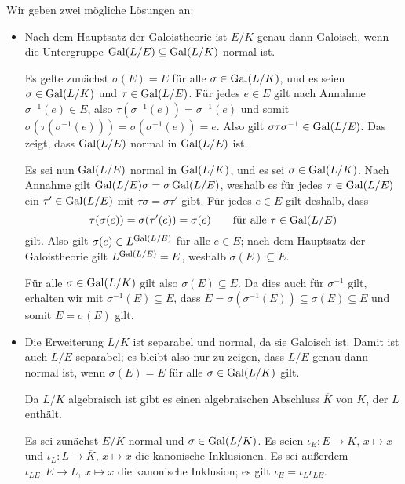 \begin{solution}
  Wir geben zwei mögliche Lösungen an:
  \begin{itemize}
    \item
      Nach dem Hauptsatz der Galoistheorie ist $E/K$ genau dann Galoisch, wenn die Untergruppe $\operatorname{Gal}(L/E) \subseteq \operatorname{Gal}(L/K)$ normal ist.
      
      Es gelte zunächst $\sigma(E) = E$ für alle $\sigma \in \operatorname{Gal}(L/K)$, und es seien $\sigma \in \operatorname{Gal}(L/K)$ und $\tau \in \operatorname{Gal}(L/E)$.
      Für jedes $e \in E$ gilt nach Annahme $\sigma^{-1}(e) \in E$, also $\tau(\sigma^{-1}(e)) = \sigma^{-1}(e)$ und somit $\sigma(\tau(\sigma^{-1}(e))) = \sigma(\sigma^{-1}(e)) = e$.
      Also gilt $\sigma \tau \sigma^{-1} \in \operatorname{Gal}(L/E)$.
      Das zeigt, dass $\operatorname{Gal}(L/E)$ normal in $\operatorname{Gal}(L/E)$ ist.
      
      Es sei nun $\operatorname{Gal}(L/E)$ normal in $\operatorname{Gal}(L/K)$, und es sei $\sigma \in \operatorname{Gal}(L/K)$.
      Nach Annahme gilt $\operatorname{Gal}(L/E) \sigma = \sigma \operatorname{Gal}(L/E)$, weshalb es für jedes $\tau \in \operatorname{Gal}(L/E)$ ein $\tau' \in \operatorname{Gal}(L/E)$ mit $\tau \sigma = \sigma \tau'$ gibt.
      Für jedes $e \in E$ gilt deshalb, dass
      \[
        \tau(\sigma(e)) = \sigma(\tau'(e)) = \sigma(e)
        \qquad
        \text{für alle $\tau \in \operatorname{Gal}(L/E)$}
      \]
      gilt.
      Also gilt $\sigma(e) \in L^{\operatorname{Gal}(L/E)}$ für alle $e \in E$;
      nach dem Hauptsatz der Galoistheorie gilt $L^{\operatorname{Gal}(L/E)} = E$, weshalb $\sigma(E) \subseteq E$.
      
      Für alle $\sigma \in \operatorname{Gal}(L/K)$ gilt also $\sigma(E) \subseteq E$.
      Da dies auch für $\sigma^{-1}$ gilt, erhalten wir mit $\sigma^{-1}(E) \subseteq E$, dass $E = \sigma(\sigma^{-1}(E)) \subseteq \sigma(E) \subseteq E$ und somit $E = \sigma(E)$ gilt.
      
    \item
      Die Erweiterung $L/K$ ist separabel und normal, da sie Galoisch ist.
      Damit ist auch $L/E$ separabel;
      es bleibt also nur zu zeigen, dass $L/E$ genau dann normal ist, wenn $\sigma(E) = E$ für alle $\sigma \in \operatorname{Gal}(L/K)$ gilt.
      
      Da $L/K$ algebraisch ist gibt es einen algebraischen Abschluss $\overline{K}$ von $K$, der $L$ enthält.
      
      Es sei zunächst $E/K$ normal und $\sigma \in \operatorname{Gal}(L/K)$.
      Es seien $\iota_E \colon E \to \overline{K}$, $x \mapsto x$ und $\iota_L \colon L \to \overline{K}$, $x \mapsto x$ die kanonische Inklusionen.
      Es sei außerdem $\iota_{LE} \colon E \to L$, $x \mapsto x$ die kanonische Inklusion;
      es gilt $\iota_E = \iota_L \iota_{LE}$.
      

\end{itemize}
\end{solution}
